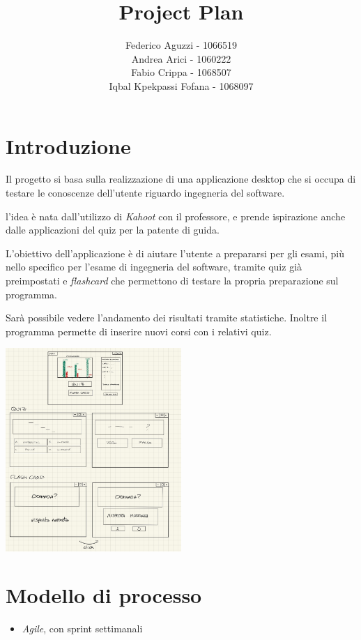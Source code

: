 \documentclass[12pt]{article}
\title{
\vspace{-2cm}
Project Plan
}
\author{
Federico Aguzzi - 1066519 \\
Andrea Arici - 1060222 \\
Fabio Crippa - 1068507 \\
Iqbal Kpekpassi Fofana - 1068097
}
\date{}
\begin{document}
\maketitle

\section{Introduzione}

Il progetto si basa sulla realizzazione di una applicazione desktop che si
occupa di testare le conoscenze dell’utente riguardo ingegneria del software.

l’idea è nata dall’utilizzo di \emph{Kahoot} con il professore, e prende
ispirazione anche dalle applicazioni del quiz per la patente di guida.

L'obiettivo dell’applicazione è di aiutare l’utente a prepararsi per gli esami,
più nello specifico per l'esame di ingegneria del software, tramite quiz già
preimpostati e \emph{flashcard} che permettono di testare la propria
preparazione sul programma.

Sarà possibile vedere l'andamento dei risultati tramite statistiche. Inoltre il
programma permette di inserire nuovi corsi con i relativi quiz.

\begin{center}
\includegraphics[width=0.5\textwidth]{project_plan_pictures/bozzaProgettoIS.png}
\end{center}


\section{Modello di processo}

\begin{itemize}
	\item \emph{Agile}, con sprint settimanali
\end{itemize}
\end{document}

